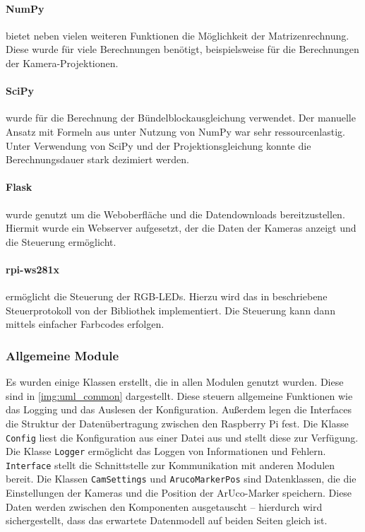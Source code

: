 \documentclass[./00PhotoBox.tex]{subfiles}
\begin{document}
\paragraph{NumPy}
bietet neben vielen weiteren Funktionen die Möglichkeit der Matrizenrechnung. Diese wurde für viele Berechnungen benötigt, beispielsweise für die Berechnungen der Kamera-Projektionen.

\paragraph{SciPy}
wurde für die Berechnung der Bündelblockausgleichung verwendet. Der manuelle Ansatz mit Formeln aus \cite{luhmann} unter Nutzung von NumPy war sehr ressourcenlastig. Unter Verwendung von SciPy und der Projektionsgleichung konnte die Berechnungsdauer stark dezimiert werden.

\paragraph{Flask}
wurde genutzt um die Weboberfläche und die Datendownloads bereitzustellen. Hiermit wurde ein Webserver aufgesetzt, der die Daten der Kameras anzeigt und die Steuerung ermöglicht.

\paragraph{rpi-ws281x}
\label{p:ws281x}
ermöglicht die Steuerung der RGB-LEDs. Hierzu wird das in \cite{ws2811} beschriebene Steuerprotokoll von der Bibliothek implementiert. Die Steuerung kann dann mittels einfacher Farbcodes erfolgen.

\subsubsection{Allgemeine Module}
Es wurden einige Klassen erstellt, die in allen Modulen genutzt wurden. Diese sind in \autoref{img:uml_common} dargestellt. Diese steuern allgemeine Funktionen wie das Logging und das Auslesen der Konfiguration. Außerdem legen die Interfaces die Struktur der Datenübertragung zwischen den Raspberry Pi fest. Die Klasse \texttt{Config} liest die Konfiguration aus einer Datei aus und stellt diese zur Verfügung. Die Klasse \texttt{Logger} ermöglicht das Loggen von Informationen und Fehlern. \texttt{Interface} stellt die Schnittstelle zur Kommunikation mit anderen Modulen bereit. Die Klassen \texttt{CamSettings} und \texttt{ArucoMarkerPos} sind Datenklassen, die die Einstellungen der Kameras und die Position der ArUco-Marker speichern. Diese Daten werden zwischen den Komponenten ausgetauscht -- hierdurch wird sichergestellt, dass das erwartete Datenmodell auf beiden Seiten gleich ist.
\end{document}
